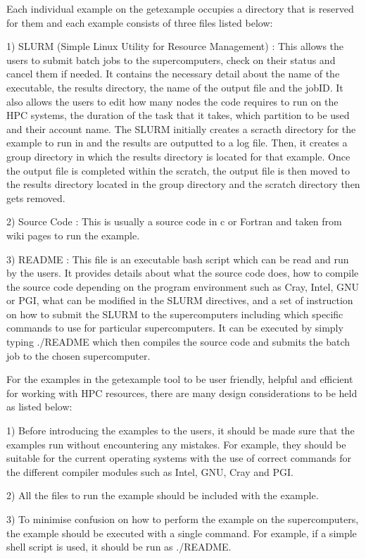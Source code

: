 \documentclass[journal]{IEEEtran}
\begin{document}
Each individual example on the getexample occupies a directory that is reserved for them and each example consists of three files listed below:
    
1) SLURM (Simple Linux Utility for Resource Management) : This allows the users to submit batch jobs to the supercomputers, check on their status and 
cancel them if needed. It contains the necessary detail about the name of the executable, the results directory, the name of the output file and 
the jobID. It also allows the users to edit how many nodes the code requires to run on the HPC systems, the duration of the task that it takes, which 
partition to be used and their account name. The SLURM initially creates a scracth directory for the example to run in and the results are outputted to 
a log file. Then, it creates a group directory in which the results directory is located for that example. Once the output file is completed within the 
scratch, the output file is then moved to the results directory located in the group directory and the scratch directory then gets removed.

2) Source Code : This is usually a source code in c or Fortran and taken from wiki pages to run the example.

3) README : This file is an executable bash script which can be read and run by the users. It provides details about what the source code does,
how to compile the source code depending on the program environment such as Cray, Intel, GNU or PGI, what can be modified in the SLURM directives, and 
a set of instruction on how to submit the SLURM to the supercomputers including which specific commands to use for particular supercomputers. It can be
executed by simply typing ./README which then compiles the source code and submits the batch job to the chosen supercomputer.

For the examples in the getexample tool to be user friendly, helpful and efficient for working with HPC resources, there are many design considerations 
to be held as listed below:

1) Before introducing the examples to the users, it should be made sure that the examples run  without encountering any mistakes. For example,
they should be suitable for the current operating systems with the use of correct commands for the different compiler modules such as Intel, GNU, Cray
and PGI. 

2) All the files to run the example should be included with the example.

3) To minimise confusion on how to perform the example on the supercomputers, the example should be executed with a single command. For example, 
if a simple shell script is used, it should be run as ./README.
\end{document}
